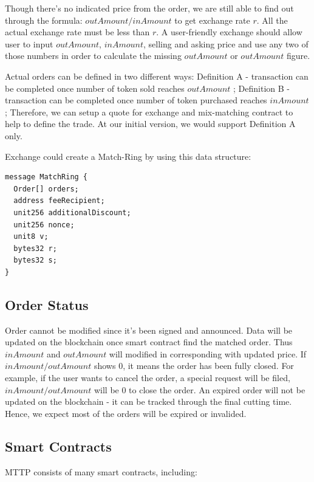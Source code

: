\documentclass[UTF8,nofonts]{article}
\begin{document}
Though there's no indicated price from the order, we are still able to find out through the formula: $outAmount / inAmount$ to get exchange rate $r$. All the actual exchange rate must be less than $r$. A user-friendly exchange should allow user to input $outAmount$, $inAmount$,  selling and asking price and use any two of those numbers in order to calculate the missing $outAmount$ or $outAmount$ figure.

Actual orders can be defined in two different ways: Definition A - transaction can be completed once number of token sold reaches $outAmount$ ; Definition B - transaction can be completed once number of token purchased reaches $inAmount$; Therefore,  we can setup a quote for exchange and mix-matching contract to help to define the trade. At our initial version,  we would support Definition A only.

Exchange could create a Match-Ring by using this data structure:
\begin{verbatim}
message MatchRing {
  Order[] orders;
  address feeRecipient;
  unit256 additionalDiscount;
  unit256 nonce;
  unit8 v;
  bytes32 r;
  bytes32 s;
}
\end{verbatim}


\subsection{Order Status\label{sec: orderstate}}


Order cannot be modified since it's been signed and announced. Data will be updated on the blockchain once smart contract find the matched order. Thus $inAmount$ and $outAmount$ will modified in corresponding with updated price. If $inAmount / outAmount$ shows 0,  it means the order has been fully closed. For example,  if the user wants to cancel the order,  a special request will be filed,  $inAmount / outAmount$ will be 0 to close the order. An expired order will not be updated on the blockchain - it can be tracked through the final cutting time. Hence,  we expect most of the orders will be expired or invalided.

\subsection{Smart Contracts\label{sec: contracts}}

MTTP consists of many smart contracts,  including:
\end{document}
